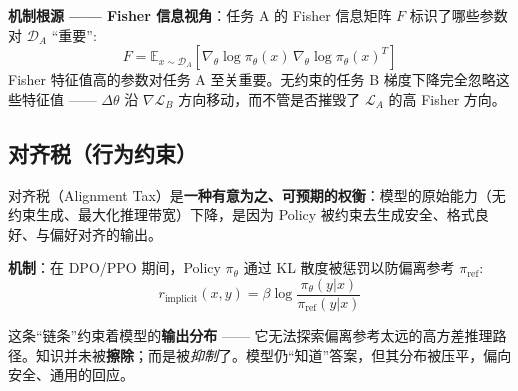 \textbf{机制根源 —— Fisher 信息视角}：任务 A 的 Fisher 信息矩阵 $F$ 标识了哪些参数对 $\mathcal{D}_A$ “重要”:
\begin{equation}
F = \mathbb{E}_{x \sim \mathcal{D}_A}\!\left[\nabla_\theta \log \pi_\theta(x)\, \nabla_\theta \log \pi_\theta(x)^T\right]
\end{equation}
 Fisher 特征值高的参数对任务 A 至关重要。无约束的任务 B 梯度下降完全忽略这些特征值 —— $\Delta\theta$ 沿 $\nabla\mathcal{L}_B$ 方向移动，而不管是否摧毁了 $\mathcal{L}_A$ 的高 Fisher 方向。

\subsection{对齐税（行为约束）}
\label{alignment-tax-behavioral-constraint}

对齐税（Alignment Tax）是\textbf{一种有意为之、可预期的权衡}：模型的原始能力（无约束生成、最大化推理带宽）下降，是因为 Policy 被约束去生成安全、格式良好、与偏好对齐的输出。

\textbf{机制}：在 DPO/PPO 期间，Policy $\pi_\theta$ 通过 KL 散度被惩罚以防偏离参考 $\pi_{\text{ref}}$:
\begin{equation}
r_{\text{implicit}}(x, y) = \beta \log \frac{\pi_\theta(y|x)}{\pi_{\text{ref}}(y|x)}
\end{equation}

这条“链条”约束着模型的\textbf{输出分布} —— 它无法探索偏离参考太远的高方差推理路径。知识并未被\textbf{擦除}；而是被\emph{抑制}了。模型仍“知道”答案，但其分布被压平，偏向安全、通用的回应。

